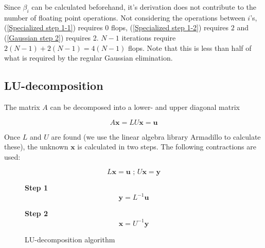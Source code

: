 \documentclass[11pt]{article}
\begin{document}
\begin{flushleft}
Since $\beta_i$ can be calculated beforehand, it's derivation does not contribute to the number of floating point operations. Not considering the operations between $i$'s, (\ref{Specialized step 1-1}) requires $0$ flops, (\ref{Specialized step 1-2}) requires $2$ and (\ref{Gaussian step 2}) requires 2. $N-1$ iterations require $2(N-1) + 2 (N-1) = 4(N-1)$ flops. Note that this is less than half of what is required by the regular Gaussian elimination.
\end{flushleft}



\subsection*{LU-decomposition}

\begin{flushleft}
The matrix $A$ can be decomposed into a lower- and upper diagonal matrix \cite{lindstrom2011flervariabel}

\begin{equation}
A \textbf{x} = LU \textbf{x} =  \textbf{u}
\end{equation}

Once $L$ and $U$ are found (we use the linear algebra library Armadillo to calculate these),  the unknown $\textbf{x}$ is calculated in two steps. The following contractions are used:

\begin{equation*}
L \textbf{x} = \textbf{u} \textbf{ ; } U \textbf{x} = \textbf{y}
\end{equation*}

\begin{figure}[ht]\label{LU algorithm}
\begin{framed}
\begin{minipage}[b]{0.45\linewidth}
\centering
\textbf{Step 1}
\begin{equation}
\textbf{y} = L^{-1} \textbf{u}
\end{equation}
\end{minipage}
\hspace{0.5cm}
\begin{minipage}[b]{0.45\linewidth}
\centering
\textbf{Step 2}
\begin{equation}
\textbf{x} = U^{-1} \textbf{y}
\end{equation}
\end{minipage}
\end{framed}
\caption{LU-decomposition algorithm}
\end{figure}


\end{flushleft}
\end{document}
